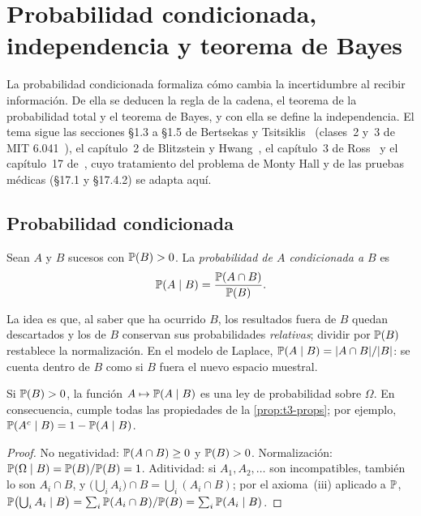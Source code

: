 \chapter{Probabilidad condicionada, independencia y teorema de Bayes}
\label{tema:4}

La probabilidad condicionada formaliza cómo cambia la incertidumbre al recibir información. De ella se deducen la regla de la cadena, el teorema de la probabilidad total y el teorema de Bayes, y con ella se define la independencia. El tema sigue las secciones §1.3 a §1.5 de Bertsekas y Tsitsiklis~\cite{bt} (clases~2 y~3 de MIT 6.041~\cite{mit6041f10}), el capítulo~2 de Blitzstein y Hwang~\cite{bh}, el capítulo~3 de Ross~\cite{ross} y el capítulo~17 de~\cite{mcs}, cuyo tratamiento del problema de Monty Hall y de las pruebas médicas (§17.1 y §17.4.2) se adapta aquí.

\section{Probabilidad condicionada}

\begin{definicion}
Sean $A$ y $B$ sucesos con $\mathbb{P}(B)>0$. La \emph{probabilidad de $A$ condicionada a $B$} es
\[
\mathbb{P}(A\mid B)=\frac{\mathbb{P}(A\cap B)}{\mathbb{P}(B)}.
\]
\end{definicion}

La idea es que, al saber que ha ocurrido $B$, los resultados fuera de $B$ quedan descartados y los de $B$ conservan sus probabilidades \emph{relativas}; dividir por $\mathbb{P}(B)$ restablece la normalización. En el modelo de Laplace, $\mathbb{P}(A\mid B)=\lvert A\cap B\rvert/\lvert B\rvert$: se cuenta dentro de $B$ como si $B$ fuera el nuevo espacio muestral.

\begin{proposicion}\label{prop:t4-esprob}
Si $\mathbb{P}(B)>0$, la función $A\mapsto\mathbb{P}(A\mid B)$ es una ley de probabilidad sobre $\Omega$. En consecuencia, cumple todas las propiedades de la \cref{prop:t3-props}; por ejemplo, $\mathbb{P}(A^{c}\mid B)=1-\mathbb{P}(A\mid B)$.
\end{proposicion}

\begin{proof}
No negatividad: $\mathbb{P}(A\cap B)\ge0$ y $\mathbb{P}(B)>0$. Normalización: $\mathbb{P}(\Omega\mid B)=\mathbb{P}(B)/\mathbb{P}(B)=1$. Aditividad: si $A_1,A_2,\dots$ son incompatibles, también lo son $A_i\cap B$, y $\bigl(\bigcup_iA_i\bigr)\cap B=\bigcup_i(A_i\cap B)$; por el axioma~(iii) aplicado a $\mathbb{P}$, $\mathbb{P}\bigl(\bigcup_iA_i\mid B\bigr)=\sum_i\mathbb{P}(A_i\cap B)/\mathbb{P}(B)=\sum_i\mathbb{P}(A_i\mid B)$.
\end{proof}

